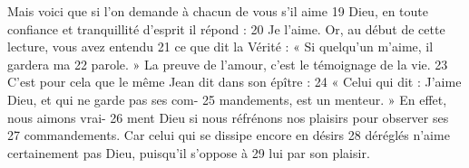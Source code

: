 Mais voici que si l'on demande à chacun de vous s'il aime	 
19	 	Dieu, en toute confiance et tranquillité d'esprit il répond :	 
20	 	Je l'aime. Or, au début de cette lecture, vous avez entendu	 
21	 	ce que dit la Vérité : « Si quelqu'un m'aime, il gardera ma	 
22	 	parole. » La preuve de l'amour, c'est le témoignage de la vie.	 
23	 	C'est pour cela que le même Jean dit dans son épître :	 
24	 	« Celui qui dit : J'aime Dieu, et qui ne garde pas ses com-	 
25	 	mandements, est un menteur. » En effet, nous aimons vrai-	 
26	 	ment Dieu si nous réfrénons nos plaisirs pour observer ses	 
27	 	commandements. Car celui qui se dissipe encore en désirs	 
28	 	déréglés n'aime certainement pas Dieu, puisqu'il s'oppose à	 
29	 	lui par son plaisir.